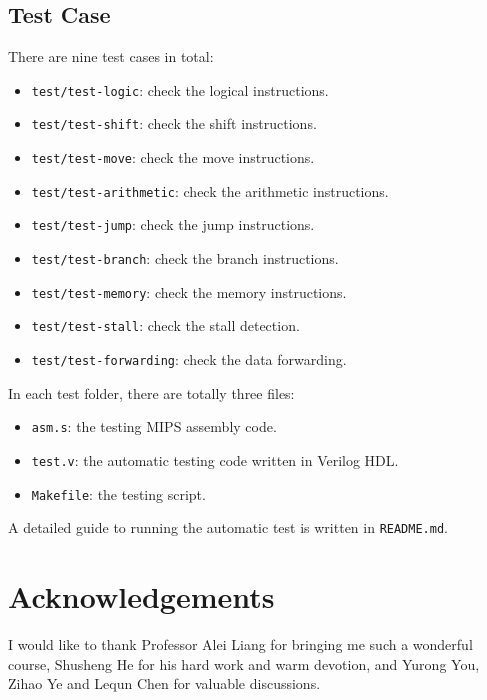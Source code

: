 \documentclass{article}
\begin{document}
\subsection{Test Case}
There are nine test cases in total:
\begin{itemize}
\item
\texttt{test/test-logic}: check the logical instructions.
\item
\texttt{test/test-shift}: check the shift instructions.
\item
\texttt{test/test-move}: check the move instructions.
\item
\texttt{test/test-arithmetic}: check the arithmetic instructions.
\item
\texttt{test/test-jump}: check the jump instructions.
\item
\texttt{test/test-branch}: check the branch instructions.
\item
\texttt{test/test-memory}: check the memory instructions.
\item
\texttt{test/test-stall}: check the stall detection.
\item
\texttt{test/test-forwarding}: check the data forwarding.
\end{itemize}
In each test folder, there are totally three files:
\begin{itemize}
\item
\texttt{asm.s}: the testing MIPS assembly code.
\item
\texttt{test.v}: the automatic testing code written in Verilog HDL.
\item
\texttt{Makefile}: the testing script.
\end{itemize}
A detailed guide to running the automatic test is written in \texttt{README.md}.


\section{Acknowledgements}
I would like to thank Professor Alei Liang for bringing me such a wonderful course, Shusheng He for his hard work and warm devotion, and Yurong You, Zihao Ye and Lequn Chen for valuable discussions.
\end{document}
